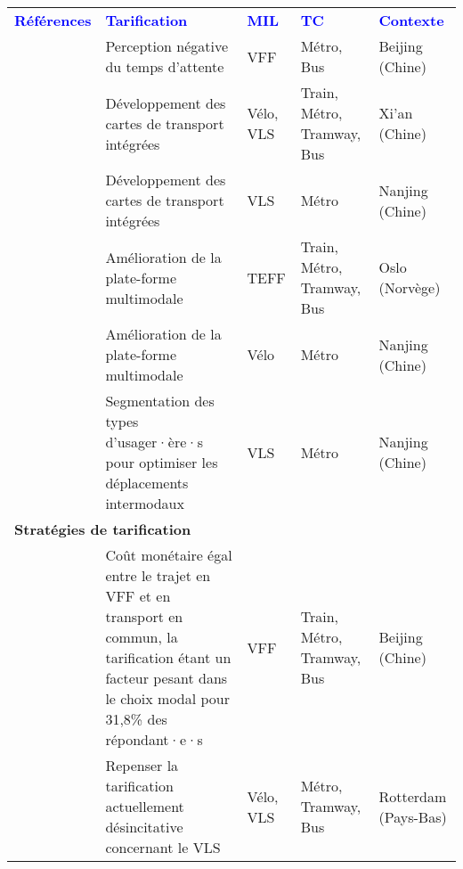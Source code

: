         \begin{longtable}{p{3cm}p{4cm}p{1.5cm}p{1.8cm}p{2.3cm}}
        \hline
        \textcolor{blue}{\textbf{Références}} & \textcolor{blue}{\textbf{Tarification}} & \textcolor{blue}{\textbf{MIL}} & \textcolor{blue}{\textbf{TC}} & \textcolor{blue}{\textbf{Contexte}}
        \hline
        \endhead
\multicolumn{5}{l}{\textbf{Plate-forme multimodale}}\\
    \small{\textcite{guo_exploring_2023}}\index{Guo, Dongbo|pagebf} & \small{Perception négative du temps d'attente} & \small{VFF} & \small{Métro, Bus} & \small{Beijing (Chine)}\\
    \small{\textcite{yang_bike-and-ride_2014}}\index{Yang, Liu|pagebf}\index{Yang, Liu|pagebf} & \small{Développement des cartes de transport intégrées} & \small{Vélo, VLS} & \small{Train, Métro, Tramway, Bus} & \small{Xi'an (Chine)}\\
    \small{\textcite{yang_empirical_2016}}\index{Yang, Min|pagebf} & \small{Développement des cartes de transport intégrées} & \small{VLS} & \small{Métro} & \small{Nanjing (Chine)}\\
    \small{\textcite{fearnley_patterns_2020}}\index{Fearnley, Nils|pagebf} & \small{Amélioration de la plate-forme multimodale} & \small{TEFF} & \small{Train, Métro, Tramway, Bus} & \small{Oslo (Norvège)}\\
    \small{\textcite{chen_determinants_2012}}\index{Chen, Lijun|pagebf} & \small{Amélioration de la plate-forme multimodale} & \small{Vélo} & \small{Métro} & \small{Nanjing (Chine)}\\
    \small{\textcite{ma_understanding_2018}}\index{Ma, Xinwei|pagebf} & \small{Segmentation des types d'usager·ère·s pour optimiser les déplacements intermodaux} & \small{VLS} & \small{Métro} & \small{Nanjing (Chine)}\\
    \hline
\multicolumn{5}{l}{\textbf{Stratégies de tarification}}\\
    \small{\textcite{fan_how_2019}}\index{Fan, Aihua|pagebf} & \small{Coût monétaire égal entre le trajet en VFF et en transport en commun, la tarification étant un facteur pesant dans le choix modal pour 31,8\% des répondant·e·s} & \small{VFF} & \small{Train, Métro, Tramway, Bus} & \small{Beijing (Chine)}\\
    \small{\textcite{montes_shared_2023}}\index{Montes, Alejandro|pagebf} & \small{Repenser la tarification actuellement désincitative concernant le VLS} & \small{Vélo, VLS} & \small{Métro, Tramway, Bus} & \small{Rotterdam (Pays-Bas)}\\

\end{longtable}
